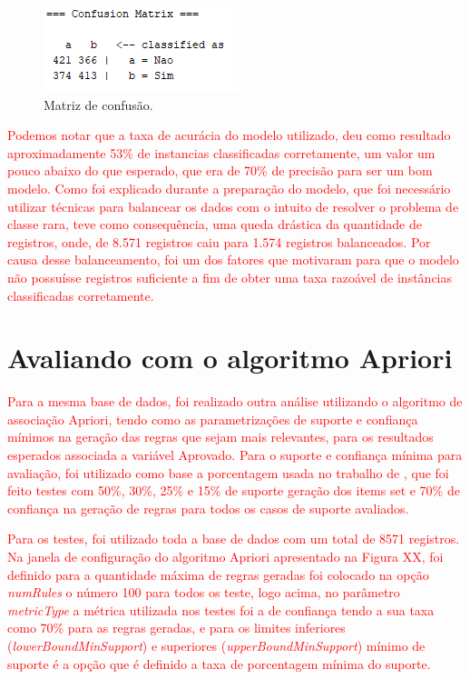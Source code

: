 \par
\begin{figure}[!htp]
	\begin{center}
    \caption{\label{fig:waveform_fig} Matriz de confusão.}
	\includegraphics[scale=0.99]{Figuras/Matriz_de_classificacao.png}
	\end{center}
\end{figure}

\par
\textcolor{red}{Podemos notar que a taxa de acurácia do modelo utilizado, deu como resultado aproximadamente 53\% de instancias classificadas corretamente, um valor um pouco abaixo do que esperado, que era de 70\% de precisão para ser um bom modelo. Como foi explicado durante a preparação do modelo, que foi necessário utilizar técnicas para balancear os dados com o intuito de resolver o problema de classe rara, teve como consequência, uma queda drástica da quantidade de registros, onde, de 8.571 registros caiu para 1.574 registros balanceados. Por causa desse balanceamento, foi um dos fatores que motivaram para que o modelo não possuísse registros suficiente a fim de obter uma taxa razoável  de instâncias classificadas corretamente.}



\section{Avaliando com o algoritmo Apriori}


\textcolor{red}{Para a mesma base de dados, foi realizado outra análise utilizando o algoritmo de associação Apriori, tendo como as parametrizações de suporte e confiança mínimos na geração das regras que sejam mais relevantes, para os resultados esperados associada a variável Aprovado. Para o suporte e confiança mínima para avaliação, foi utilizado como base a porcentagem usada no trabalho de , que foi feito testes com 50\%, 30\%, 25\% e 15\% de suporte geração dos items set e 70\% de confiança na geração de regras para todos os casos de suporte avaliados.}

\par
\textcolor{red}{Para os testes, foi utilizado toda a base de dados com um total de 8571 registros. Na janela de configuração do algoritmo Apriori apresentado na Figura XX, foi definido para a quantidade máxima de regras geradas foi colocado na opção \textit{numRules} o número 100 para todos os teste, logo acima, no parâmetro \textit{metricType} a métrica utilizada nos testes foi a de confiança tendo a sua taxa como 70\% para as regras geradas, e para os limites inferiores (\textit{lowerBoundMinSupport}) e superiores (\textit{upperBoundMinSupport}) mínimo de suporte é a opção que é definido a taxa de porcentagem mínima do suporte.}


